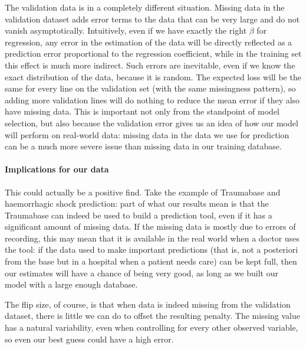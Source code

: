 \documentclass[12pt, a4paper]{memoir}
\begin{document}
The validation data is in a completely different situation. Missing data in the validation dataset adds error terms to the data that can be very large and do not vanish asymptotically. Intuitively, even if we have exactly the right $\beta$ for regression, any error in the estimation of the data will be directly reflected as a prediction error proportional to the regression coefficient, while in the training set this effect is much more indirect. Such errors are inevitable, even if we know the exact distribution of the data, because it is random. The expected loss will be the same for every line on the validation set (with the same missingness pattern), so adding more validation lines will do nothing to reduce the mean error if they also have missing data. This is important not only from the standpoint of model selection, but also because the validation error gives us an idea of how our model will perform on real-world data: missing data in the data we use for prediction can be a much more severe issue than missing data in our training database.

\paragraph{Implications for our data}

This could actually be a positive find. Take the example of Traumabase and haemorrhagic shock prediction: part of what our results mean is that the Traumabase can indeed be used to build a prediction tool, even if it has a significant amount of missing data. If the missing data is mostly due to errors of recording, this may mean that it is available in the real world when a doctor uses the tool: if the data used to make important predictions (that is, not a posteriori from the base but in a hospital when a patient needs care) can be kept full, then our estimates will have a chance of being very good, as long as we built our model with a large enough database.

The flip size, of course, is that when data is indeed missing from the validation dataset, there is little we can do to offset the resulting penalty. The missing value has a natural variability, even when controlling for every other observed variable, so even our best guess could have a high error. 
\end{document}

